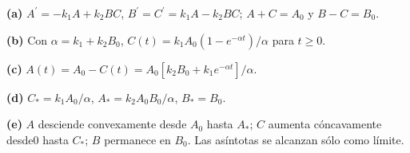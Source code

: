 \noindent\textbf{(a)} $A^{\prime}=-k_1A+k_2BC$, $B^{\prime}=C^{\prime}=k_1A-k_2BC$; $A+C=A_0$ y $B-C=B_0$.

\noindent\textbf{(b)} Con $\alpha=k_1+k_2B_0$, $C(t)=k_1A_0(1-e^{-\alpha t})/\alpha$ para $t\ge0$.

\noindent\textbf{(c)} $A(t)=A_0-C(t)=A_0[k_2B_0+k_1e^{-\alpha t}]/\alpha$.

\noindent\textbf{(d)} $C_*=k_1A_0/\alpha$, $A_*=k_2A_0B_0/\alpha$, $B_*=B_0$.

\noindent\textbf{(e)} $A$ desciende convexamente desde $A_0$ hasta $A_*$; $C$ aumenta cóncavamente desde0 hasta $C_*$; $B$ permanece en $B_0$. Las asíntotas se alcanzan sólo como límite.
